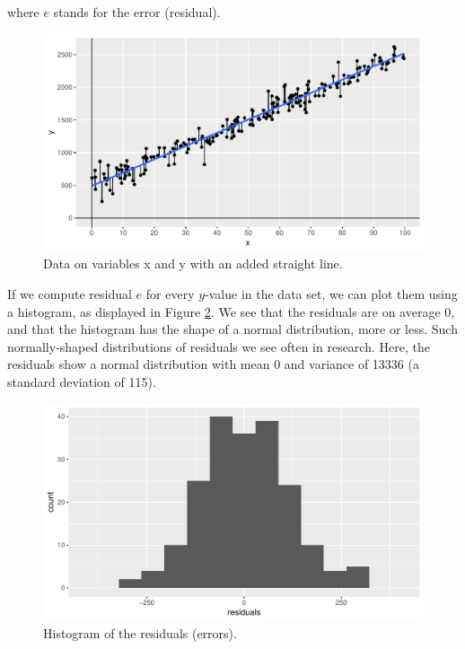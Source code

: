 \documentclass[]{report}\usepackage[]{graphicx}\usepackage[]{color}
\makeatletter
\def\maxwidth{ %
  \ifdim\Gin@nat@width>\linewidth
    \linewidth
  \else
    \Gin@nat@width
  \fi
}
\newenvironment{knitrout}{}{} %
\makeatother
\begin{document}
where $e$ stands for the error (residual).


\begin{knitrout}
\color{fgcolor}\begin{figure}

{\centering \includegraphics[width=\maxwidth]{figure/lm_10-1} 

}

\caption[Data on variables x and y with an added straight line]{Data on variables x and y with an added straight line.}\label{fig:lm_10}
\end{figure}


\end{knitrout}

If we compute residual $e$ for every $y$-value in the data set, we can plot them using a histogram, as displayed in Figure \ref{fig:lm_11}. We see that the residuals are on average 0, and that the histogram has the shape of a normal distribution, more or less. Such normally-shaped distributions of residuals we see often in research. Here, the residuals show a normal distribution with mean 0 and variance of 13336 (a standard deviation of 115).


\begin{knitrout}
\color{fgcolor}\begin{figure}

{\centering \includegraphics[width=\maxwidth]{figure/lm_11-1} 

}

\caption[Histogram of the residuals (errors)]{Histogram of the residuals (errors).}\label{fig:lm_11}
\end{figure}


\end{knitrout}
\end{document}
